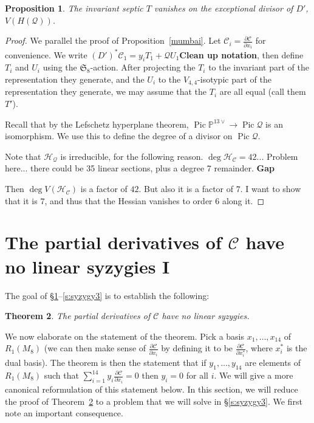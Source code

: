 \documentclass{amsart}
\newtheorem{theorem}{Theorem}[section]
\newtheorem{proposition}[theorem]{Proposition}
\theoremstyle{definition}
\theoremstyle{remark}
\DeclareMathOperator{\Pic}{Pic}
\def\SS{\mathfrak{S}}
\def\proj{\mathbb{P}}
\def\cubic{\mathcal{C}}
\def\quintic{\mathcal{Q}}
\def\hessian{\mathcal{H}}
\begin{document}
{\begin{proposition}
The invariant septic $T$ vanishes on the exceptional divisor of $D'$,
$V(H(\quintic))$.
\end{proposition}

\begin{proof}
We parallel the proof of Proposition~\ref{mumbai}.  
Let $\cubic_i = \frac {\partial \cubic} {\partial x_i}$ for convenience.
We write $(D')^* \cubic_1 =  y_i T_1 + \quintic U_1${\bf Clean up notation}, 
then define $T_i$ and $U_i$ using the $\SS_8$-action.  
After projecting the $T_i$ to the invariant part of the representation
they generate,
and the $U_i$ to the $V_{4,4}$-isotypic part of the representation
they generate, we may assume that the $T_i$ are all equal (call them
$T'$).

Recall that by the Lefschetz hyperplane theorem,
$\Pic \proj^{13 \vee} \rightarrow \Pic \quintic$ is an isomorphism.
We use this to define the degree of a divisor on $\Pic \quintic$.

Note that $\hessian_{\quintic}$ is irreducible, for the following reason.
$\deg \hessian_{\cubic} = 42$...
Problem here... there could be 35 linear sections, plus a degree 7
remainder.
{\bf Gap}

Then $\deg V(\hessian_{\cubic})$ is a factor of $42$.  But also it is a factor of $7$.
I want to show that it is $7$, and thus that the Hessian vanishes to
order $6$ along it.
\end{proof}

}%

\section{The partial derivatives of $\cubic$ have no linear syzygies I}
\label{s:syzygy1}

The goal of \S \ref{s:syzygy1}--\ref{s:syzygy3} is to establish the following:

\begin{theorem}
\label{prop:nosyz}
The partial derivatives of $\cubic$ have no linear syzygies.
\end{theorem}

We now elaborate on the statement of the theorem.  Pick a basis $x_1, \ldots, x_{14}$ of $R_1(M_8)$ (we can then make
sense of $\frac{\partial \cubic}{\partial x_i}$ by defining it to be $\frac{\partial \cubic}{\partial x_i^*}$, where
$x_i^*$ is the dual basis).  The theorem is then the statement that if $y_1, \ldots, y_{14}$ are elements of
$R_1(M_8)$ such that $\sum_{i=1}^{14} y_i \frac{\partial \cubic}{\partial x_i}=0$ then $y_i=0$ for all $i$.  We will
give a more canonical reformulation of this statement below.  In this section, we will reduce the proof of
Theorem~\ref{prop:nosyz} to a problem that we will solve in \S \ref{s:syzygy3}.  We first note an important consequence.
\end{document}

